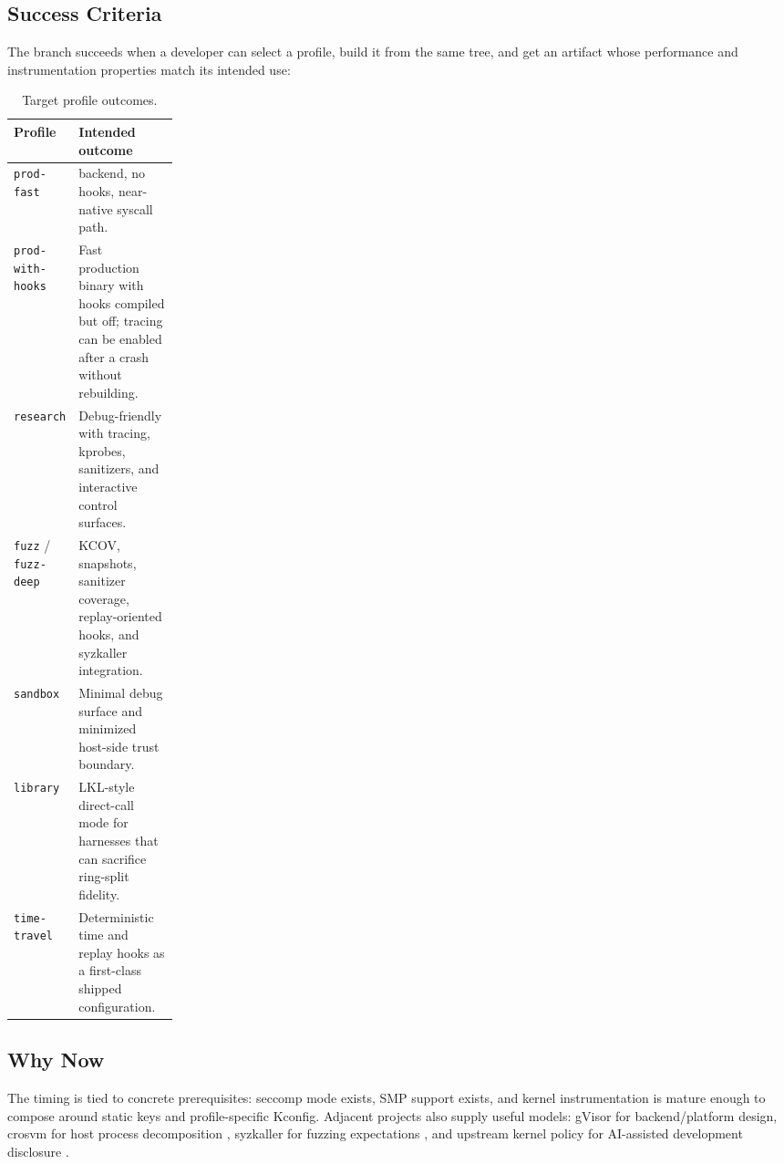 \subsection{Success Criteria}

The branch succeeds when a developer can select a profile, build it
from the same tree, and get an artifact whose performance and
instrumentation properties match its intended use:

\begin{table}[h]
\centering
\caption{Target profile outcomes.}
\begin{tabularx}{\linewidth}{@{}p{0.21\linewidth}X@{}}
\toprule
Profile & Intended outcome \\
\midrule
\texttt{prod-fast} & \KVM{} backend, no hooks, near-native syscall path. \\
\texttt{prod-with-hooks} & Fast production binary with hooks compiled but off; tracing can be enabled after a crash without rebuilding. \\
\texttt{research} & Debug-friendly \UML{} with tracing, kprobes, sanitizers, and interactive control surfaces. \\
\texttt{fuzz} / \texttt{fuzz-deep} & KCOV, snapshots, sanitizer coverage, replay-oriented hooks, and syzkaller integration. \\
\texttt{sandbox} & Minimal debug surface and minimized host-side trust boundary. \\
\texttt{library} & LKL-style direct-call mode for harnesses that can sacrifice ring-split fidelity. \\
\texttt{time-travel} & Deterministic time and replay hooks as a first-class shipped configuration. \\
\bottomrule
\end{tabularx}
\end{table}

\subsection{Why Now}

The timing is tied to concrete prerequisites: seccomp mode exists, SMP
support exists, and kernel instrumentation is mature enough to compose
around static keys and profile-specific Kconfig. Adjacent projects
also supply useful models: gVisor for backend/platform design, crosvm
for host process decomposition \cite{crosvm}, syzkaller for fuzzing
expectations \cite{syzkaller}, and upstream kernel policy for
AI-assisted development disclosure \cite{coding-assistants}.
